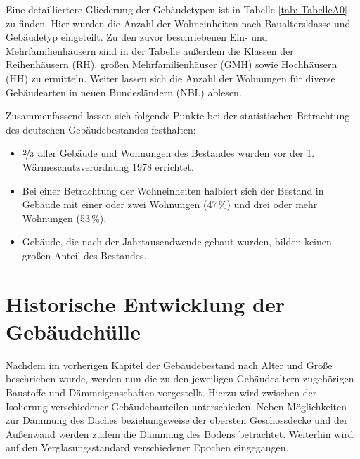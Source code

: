 Eine detailliertere Gliederung der Gebäudetypen ist in Tabelle \ref{tab: TabelleA0} zu finden. 
Hier wurden die Anzahl der Wohneinheiten nach Baualtersklasse und Gebäudetyp eingeteilt. 
Zu den zuvor beschriebenen Ein- und Mehrfamilienhäusern sind in der Tabelle außerdem die Klassen der Reihenhäusern (RH), großen Mehrfamilienhäuser (GMH) sowie Hochhäusern (HH) zu ermitteln. 
Weiter lassen sich die Anzahl der Wohnungen für diverse Gebäudearten in neuen Bundesländern (NBL) ablesen.

Zusammenfassend lassen sich folgende Punkte bei der statistischen Betrachtung des deutschen Gebäudebestandes festhalten:

\begin{itemize}
	\item $\nicefrac{2}{3}$ aller Gebäude und Wohnungen des Bestandes wurden vor der 1. Wärmeschutzverordnung 1978 errichtet.
	\item Bei einer Betrachtung der Wohneinheiten halbiert sich der Bestand in Gebäude mit einer oder zwei Wohnungen (47\,\%) und drei oder mehr Wohnungen (53\,\%).
	\item Gebäude, die nach der Jahrtausendwende gebaut wurden, bilden keinen großen Anteil des Bestandes.
\end{itemize}



\section{Historische Entwicklung der Gebäudehülle}
\label{sec:Sektion 22}

Nachdem im vorherigen Kapitel der Gebäudebestand nach Alter und Größe beschrieben wurde, werden nun die zu den jeweiligen Gebäudealtern zugehörigen Baustoffe und Dämmeigenschaften vorgestellt. 
Hierzu wird zwischen der Isolierung verschiedener Gebäudebauteilen unterschieden. 
Neben Möglichkeiten zur Dämmung des Daches beziehungsweise der obersten Geschossdecke und der Außenwand werden zudem die Dämmung des Bodens betrachtet.
Weiterhin wird auf den Verglasungsstandard verschiedener Epochen eingegangen.

